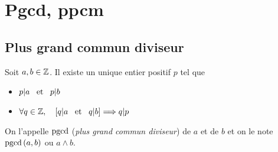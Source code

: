 \documentclass{magnolia}
\begin{document}




\section{Pgcd, ppcm}

\subsection{Plus grand commun diviseur}

\begin{definition}
Soit $a,b\in\mathbb{Z}$. Il existe un unique entier positif $p$ tel que
\begin{itemize}
\item $p|a \quad\!\text{et}\quad\! p|b$
\item $\forall q\in\mathbb{Z} ,\quad \left[q|a \quad\!\text{et}\quad\! q|b\right] \Longrightarrow q|p$
\end{itemize}
On l'appelle $\operatorname{pgcd}$ (\emph{plus grand commun diviseur}) de $a$ et de $b$ et on le note
$\operatorname{pgcd}\left(a,b\right)$ ou $a\wedge b$.
\end{definition}
\end{document}
